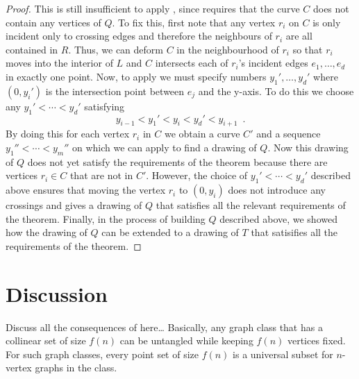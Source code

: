 \documentclass{patmorin}
\begin{document}
\begin{proof}
   This is still insufficient to apply , since 
   requires that the curve $C$ does not contain any vertices of $Q$.
   To fix this, first note that any vertex $r_i$ on $C$ is only incident
   only to crossing edges and therefore the neighbours of $r_i$ are all
   contained in $R$. Thus, we can deform $C$ in the neighbourhood of $r_i$
   so that $r_i$ moves into the interior of $L$ and $C$ intersects each
   of $r_i$'s incident edges $e_1,\ldots,e_d$ in exactly one point.  Now,
   to apply  we must specify numbers $y_1',\ldots,y_d'$ where
   $(0,y_i')$ is the intersection point between $e_j$ and the y-axis.
   To do this we choose any $y_1'<\cdots<y_d'$ satisfying
   \[
       y_{i-1} < y_1' < y_i < y_d' < y_{i+1} \enspace .
   \]
   By doing this for each vertex $r_i$ in $C$ we obtain a curve $C'$ and
   a sequence $y_1''<\cdots<y_m''$ on which we can apply  to
   find a drawing of $Q$.  Now this drawing of $Q$ does not yet satisfy
   the requirements of the theorem because there are vertices $r_i\in
   C$ that are not in $C'$. However, the choice of $y_1'<\cdots<y_d'$
   described above ensures that moving the vertex $r_i$ to $(0,y_i)$
   does not introduce any crossings and gives a drawing of $Q$ that
   satisfies all the relevant requirements of the theorem.  Finally,
   in the process of building $Q$ described above, we showed how the
   drawing of $Q$ can be extended to a drawing of $T$ that satisifies
   all the requirements of the theorem.
\end{proof}



\section{Discussion}

Discuss all the consequences of  here\ldots
Basically, any graph class that has a collinear set of size $f(n)$ can 
be untangled while keeping $f(n)$ vertices fixed.  For such graph classes,
every point set of size $f(n)$ is a universal subset for $n$-vertex graphs
in the class.
\end{document}
